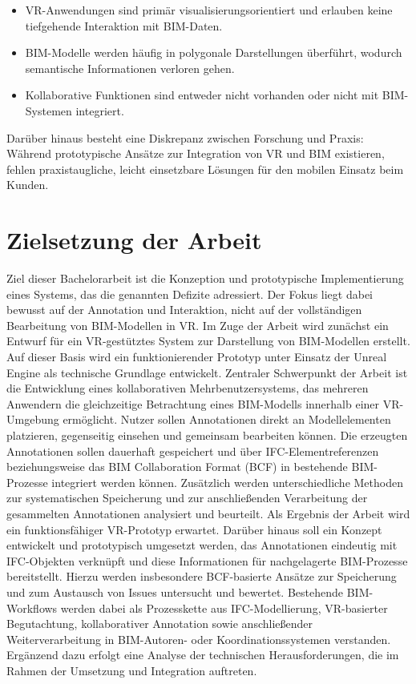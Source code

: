 \begin{itemize}
\item VR-Anwendungen sind primär visualisierungsorientiert und erlauben keine tiefgehende Interaktion mit BIM-Daten.\cite{Du2018}
\item BIM-Modelle werden häufig in polygonale Darstellungen überführt, wodurch semantische Informationen verloren gehen.\cite{Wang2018}
\item Kollaborative Funktionen sind entweder nicht vorhanden oder nicht mit BIM-Systemen integriert.\cite{Messner2003}
\end{itemize}

Darüber hinaus besteht eine Diskrepanz zwischen Forschung und Praxis: Während prototypische Ansätze zur Integration von VR und BIM existieren, fehlen praxistaugliche, leicht einsetzbare Lösungen für den mobilen Einsatz beim Kunden.

\section{Zielsetzung der Arbeit}

Ziel dieser Bachelorarbeit ist die Konzeption und prototypische Implementierung eines Systems, das die genannten Defizite adressiert.
Der Fokus liegt dabei bewusst auf der Annotation und Interaktion, nicht auf der vollständigen Bearbeitung von BIM-Modellen in VR.\@
Im Zuge der Arbeit wird zunächst ein Entwurf für ein VR-gestütztes System zur Darstellung von BIM-Modellen erstellt.
Auf dieser Basis wird ein funktionierender Prototyp unter Einsatz der Unreal Engine als technische Grundlage entwickelt.
Zentraler Schwerpunkt der Arbeit ist die Entwicklung eines kollaborativen Mehrbenutzersystems, das mehreren Anwendern die gleichzeitige Betrachtung eines BIM-Modells innerhalb einer VR-Umgebung ermöglicht.
Nutzer sollen Annotationen direkt an Modellelementen platzieren, gegenseitig einsehen und gemeinsam bearbeiten können.
Die erzeugten Annotationen sollen dauerhaft gespeichert und über IFC-Elementreferenzen beziehungsweise das BIM Collaboration Format (BCF) in bestehende BIM-Prozesse integriert werden können.
Zusätzlich werden unterschiedliche Methoden zur systematischen Speicherung und zur anschließenden Verarbeitung der gesammelten Annotationen analysiert und beurteilt.
Als Ergebnis der Arbeit wird ein funktionsfähiger VR-Prototyp erwartet.
Darüber hinaus soll ein Konzept entwickelt und prototypisch umgesetzt werden, das Annotationen eindeutig mit IFC-Objekten verknüpft und diese Informationen für nachgelagerte BIM-Prozesse bereitstellt.
Hierzu werden insbesondere BCF-basierte Ansätze zur Speicherung und zum Austausch von Issues untersucht und bewertet.
Bestehende BIM-Workflows werden dabei als Prozesskette aus IFC-Modellierung, VR-basierter Begutachtung, kollaborativer Annotation sowie anschließender Weiterverarbeitung in BIM-Autoren- oder Koordinationssystemen verstanden.
Ergänzend dazu erfolgt eine Analyse der technischen Herausforderungen, die im Rahmen der Umsetzung und Integration auftreten.

